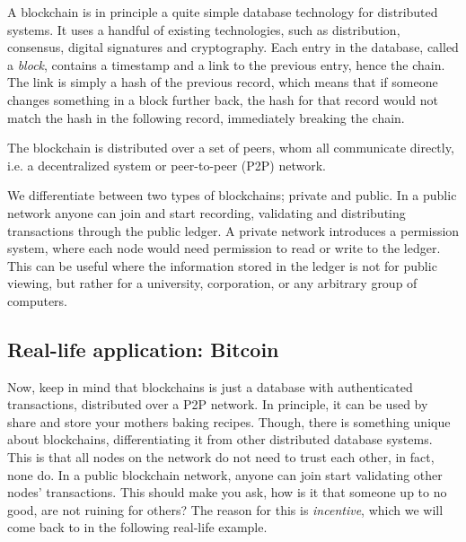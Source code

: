 


A blockchain is in principle a quite simple database technology for
distributed systems. It uses a handful of existing technologies, such
as distribution, consensus, digital signatures and cryptography.  Each
entry in the database, called a \textit{block}, contains a timestamp
and a link to the previous entry, hence the chain. The link is simply a
hash of the previous record, which means that if someone changes
something in a block further back, the hash for that record would not
match the hash in the following record, immediately breaking the
chain.

The blockchain is distributed over a set of peers, whom all communicate
directly, i.e. a decentralized system or peer-to-peer (P2P) network.


We differentiate between two types of blockchains; private and
public. In a public network anyone can join and start recording,
validating and distributing transactions through the public
ledger. A private network introduces a permission system, where each
node would need permission to read or write to the ledger. This can be
useful where the information stored in the ledger is not for public
viewing, but rather for a university, corporation, or any arbitrary
group of computers.


\subsection{Real-life application: Bitcoin}
Now, keep in mind that blockchains is just a database with
authenticated transactions, distributed over a P2P network. In
principle, it can be used by share and store your mothers baking
recipes. Though, there is something unique about blockchains,
differentiating it from other distributed database systems. This is
that all nodes on the network do not need to trust each other, in fact,
none do. In a public blockchain network, anyone can join start
validating other nodes' transactions. This should make you ask, how is
it that someone up to no good, are not ruining for others? The reason for
this is \textit{incentive}, which we will come back to in the following
real-life example.

